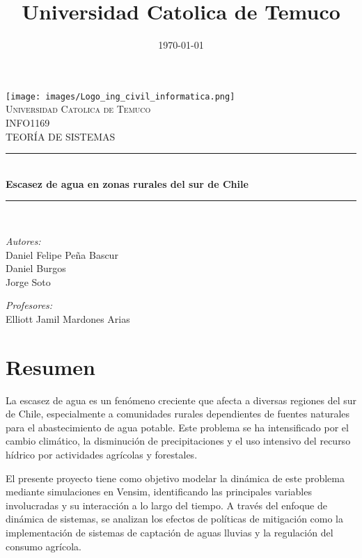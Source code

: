 \documentclass[10pt]{article}
\title{Universidad Catolica de Temuco}		%
\date{\today}							%
\makeatletter
\let\thedate\@date
\makeatother
\begin{document}
\renewcommand{\listtablename}{Lista de Tablas}
\renewcommand{\tablename}{Tabla}
\renewcommand{\listfigurename}{Lista de Figuras}
\renewcommand{\figurename}{Figura }
\begin{titlepage}
	\centering
    \texttt{[image: images/Logo\_ing\_civil\_informatica.png]}\\[1.0 cm]
    \textsc{\LARGE Universidad Catolica de Temuco}\\[2.0 cm]
	\textsc{\Large INFO1169}\\[0.5 cm]
	\textsc{\large TEORÍA DE SISTEMAS}\\[0.5 cm]
	\rule{\linewidth}{0.2 mm} \\[0.4 cm]
	{ \huge \bfseries Escasez de agua en zonas rurales del sur de Chile}\\
	\rule{\linewidth}{0.2 mm} \\[1.5 cm]
	
 \begin{flushleft} \large
    \emph{Autores:}\\
    Daniel Felipe Peña Bascur\\
    Daniel Burgos\\
    Jorge Soto\\
 \end{flushleft}
 
  \begin{flushleft} \large
    \emph{Profesores:}\\
	Elliott Jamil Mardones Arias \\
  \end{flushleft}
  
  \vfill

  {\large \thedate}

\end{titlepage}

\pagebreak

\section{Resumen}

La escasez de agua es un fenómeno creciente que afecta a diversas regiones del sur de Chile, especialmente a comunidades rurales dependientes de fuentes naturales para el abastecimiento de agua potable. Este problema se ha intensificado por el cambio climático, la disminución de precipitaciones y el uso intensivo del recurso hídrico por actividades agrícolas y forestales.

El presente proyecto tiene como objetivo modelar la dinámica de este problema mediante simulaciones en Vensim, identificando las principales variables involucradas y su interacción a lo largo del tiempo. A través del enfoque de dinámica de sistemas, se analizan los efectos de políticas de mitigación como la implementación de sistemas de captación de aguas lluvias y la regulación del consumo agrícola.
\end{document}
